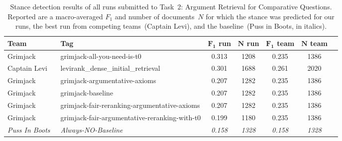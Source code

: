\begin{table}[t]
\centering
\footnotesize
\renewcommand{\tabcolsep}{5pt}
\caption{Stance detection results of all runs submitted to Task~2: Argument Retrieval for Comparative Questions. Reported are a macro-averaged $F_1$ and number of documents~$N$ for which the stance was predicted for our runs, the best run from competing teams~(Captain Levi), and the baseline~(Puss in Boots, in italics).}
\label{table-results-stance}
\begin{tabular}{@{}llccccc@{}}
\toprule
\textbf{Team} & \textbf{Tag} & \textbf{$\bm{F_1}$ run} & \textbf{$\bm{N}$ run} & \textbf{$\bm{F_1}$ team} & \textbf{$\bm{N}$ team} \\
\midrule
Grimjack & grimjack-all-you-need-is-t0 & 0.313 & 1208 & 0.235 & 1386 \\
Captain Levi~\cite{RanaGJCEHP2022} & levirank\_dense\_initial\_retrieval & 0.301 & 1688 & 0.261 & 2020 \\
Grimjack & grimjack-argumentative-axioms & 0.207 & 1282 & 0.235 & 1386 \\
Grimjack & grimjack-baseline & 0.207 & 1282 & 0.235 & 1386 \\
Grimjack & grimjack-fair-reranking-argumentative-axioms & 0.207 & 1282 & 0.235 & 1386 \\
Grimjack & grimjack-fair-argumentative-reranking-with-t0 & 0.199 & 1180 & 0.235 & 1386 \\
\textit{Puss In Boots}~\cite{BondarenkoFKSGBPBSWPH2022} & \textit{Always-NO-Baseline} & \textit{0.158} & \textit{1328} & \textit{0.158} & \textit{1328} \\
\bottomrule
\end{tabular}
\end{table}
